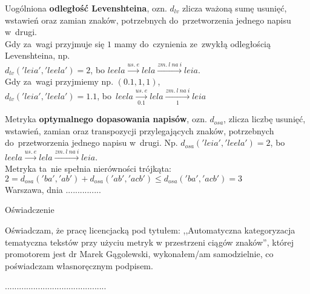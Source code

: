 \documentclass[12pt, twoside, openany]{report}
\theoremstyle{plain}
\begin{document}
Uogólniona \textbf{odległość Levenshteina}, ozn. $d_{lv}$ zlicza ważoną sumę usunięć, wstawień oraz zamian znaków, potrzebnych do~przetworzenia jednego napisu w~drugi. \\


Gdy za~wagi przyjmuje się $1$ mamy do~czynienia ze~zwykłą odległością Levenshteina, np. \\
$d_{lv}('leia', 'leela') = 2$, bo $leela  \xrightarrow{us.\ e} lela  \xrightarrow{zm.\ l\ na\ i} leia$. \\

Gdy za~wagi przyjmiemy np. $(0.1, 1, 1)$, \\
$d_{lv}('leia', 'leela') = 1.1$, bo~$leela  \xrightarrow[0.1]{us.\ e} lela  \xrightarrow[1]{zm.\ l\ na\ i} leia$ 


Metryka \textbf{optymalnego dopasowania napisów}, ozn. $d_{osa}$, zlicza liczbę usunięć, wstawień, zamian oraz transpozycji przylegających znaków, potrzebnych do~przetworzenia jednego napisu w~drugi. Np. $d_{osa}('leia', 'leela') = 2$, bo $leela  \xrightarrow{us.\ e} lela  \xrightarrow{zm.\ l\ na\ i} leia$. \\

Metryka ta~nie spełnia nierówności trójkąta: $2 = d_{osa}('ba', 'ab') + d_{osa}('ab', 'acb') \leq d_{osa}('ba', 'acb') = 3$\\





\clearpage
\pagestyle{empty}
\noindent Warszawa, dnia ...............
\vspace{5cm}
\begin{center}
\LARGE{Oświadczenie}
\end{center}
Oświadczam, że pracę licencjacką pod tytułem: ,,Automatyczna kategoryzacja tematyczna tekstów przy użyciu metryk w przestrzeni ciągów znaków'', której promotorem jest dr Marek Gągolewski, wykonałem/am samodzielnie, co poświadczam własnoręcznym podpisem.
\vspace{2cm}
\begin{flushright}
...........................................
\end{flushright}
\end{document}
